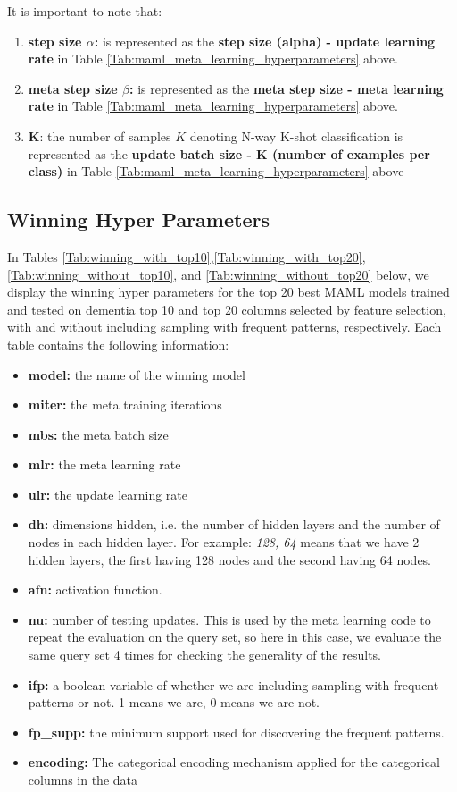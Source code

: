 \documentclass{article}
\begin{document}
It is important to note that:
\begin{enumerate}
\item \textbf{step size $\alpha$:} is represented as the \textbf{step size (alpha) - update learning rate} in Table \ref{Tab:maml_meta_learning_hyperparameters} above.
\item \textbf{meta step size $\beta$:} is represented as the \textbf{meta step size - meta learning rate} in Table \ref{Tab:maml_meta_learning_hyperparameters} above.
\item \textbf{K}: the number of samples $K$ denoting N-way K-shot classification is represented as the \textbf{update batch size - K (number of examples per class)} in Table \ref{Tab:maml_meta_learning_hyperparameters} above
\end{enumerate}


\subsection{Winning Hyper Parameters}
In Tables \ref{Tab:winning_with_top10},\ref{Tab:winning_with_top20},\ref{Tab:winning_without_top10}, and \ref{Tab:winning_without_top20} below, we display the winning hyper parameters for the top 20 best MAML models trained and tested on dementia top 10 and top 20 columns selected by feature selection, with and without including sampling with frequent patterns, respectively. Each table contains the following information:
\begin{itemize}
\item \textbf{model:} the name of the winning model
\item \textbf{miter:} the meta training iterations 
\item \textbf{mbs:} the meta batch size
\item \textbf{mlr:} the meta learning rate
\item \textbf{ulr:} the update learning rate
\item \textbf{dh:} dimensions hidden, i.e. the number of hidden layers and the number of nodes in each hidden layer. For example: \textit{128, 64} means that we have 2 hidden layers, the first having 128 nodes and the second having 64 nodes.
\item \textbf{afn:} activation function.
\item \textbf{nu:} number of testing updates. This is used by the meta learning code to repeat the evaluation on the query set, so here in this case, we evaluate the same query set 4 times for checking the generality of the results.
\item \textbf{ifp:} a boolean variable of whether we are including sampling with frequent patterns or not. 1 means we are, 0 means we are not.
\item \textbf{fp\_supp:} the minimum support used for discovering the frequent patterns.
\item \textbf{encoding:} The categorical encoding mechanism applied for the categorical columns in the data
\end{itemize}
\end{document}
